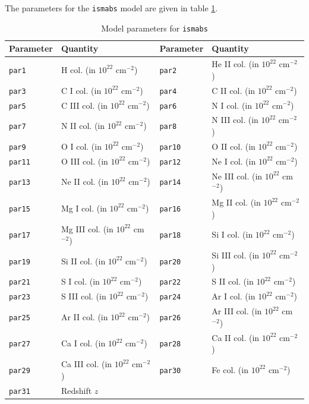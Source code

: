 			The parameters for the \texttt{ismabs} model are given in table \ref{param:ismabs}.
			\begin{table}[h!]
				\centering
				\caption{Model parameters for \texttt{ismabs}}
				\label{param:ismabs}
				\begin{tabular}{p{}p{}|p{}p{}}
					\hline
					\textbf{Parameter} & \textbf{Quantity} & \textbf{Parameter} & \textbf{Quantity} \\ \hline
					{\texttt{par1}} & {H col. (in $10^{22}$ cm$^{-2}$)} & {\texttt{par2}} & {He II col. (in $10^{22}$ cm$^{-2}$)} \\ %
					{\texttt{par3}} & {C I col. (in $10^{22}$ cm$^{-2}$)} & {\texttt{par4}} & {C II col. (in $10^{22}$ cm$^{-2}$)} \\ %
					{\texttt{par5}} & {C III col. (in $10^{22}$ cm$^{-2}$)} & {\texttt{par6}} & {N I col. (in $10^{22}$ cm$^{-2}$)} \\ %
					{\texttt{par7}} & {N II col. (in $10^{22}$ cm$^{-2}$)} & {\texttt{par8}} & {N III col. (in $10^{22}$ cm$^{-2}$)} \\ %
					{\texttt{par9}} & {O I col. (in $10^{22}$ cm$^{-2}$)} & {\texttt{par10}} & {O II col. (in $10^{22}$ cm$^{-2}$)} \\ %
					{\texttt{par11}} & {O III col. (in $10^{22}$ cm$^{-2}$)} & {\texttt{par12}} & {Ne I col. (in $10^{22}$ cm$^{-2}$)} \\ %
					{\texttt{par13}} & {Ne II col. (in $10^{22}$ cm$^{-2}$)} & {\texttt{par14}} & {Ne III col. (in $10^{22}$ cm$^{-2}$)} \\ %
					{\texttt{par15}} & {Mg I col. (in $10^{22}$ cm$^{-2}$)} & {\texttt{par16}} & {Mg II col. (in $10^{22}$ cm$^{-2}$)} \\ %
					{\texttt{par17}} & {Mg III col. (in $10^{22}$ cm$^{-2}$)} & {\texttt{par18}} & {Si I col. (in $10^{22}$ cm$^{-2}$)} \\ %
					{\texttt{par19}} & {Si II col. (in $10^{22}$ cm$^{-2}$)} & {\texttt{par20}} & {Si III col. (in $10^{22}$ cm$^{-2}$)} \\ %
					{\texttt{par21}} & {S I col. (in $10^{22}$ cm$^{-2}$)} & {\texttt{par22}} & {S II col. (in $10^{22}$ cm$^{-2}$)} \\ %
					{\texttt{par23}} & {S III col. (in $10^{22}$ cm$^{-2}$)} & {\texttt{par24}} & {Ar I col. (in $10^{22}$ cm$^{-2}$)} \\ %
					{\texttt{par25}} & {Ar II col. (in $10^{22}$ cm$^{-2}$)} & {\texttt{par26}} & {Ar III col. (in $10^{22}$ cm$^{-2}$)} \\ %
					{\texttt{par27}} & {Ca I col. (in $10^{22}$ cm$^{-2}$)} & {\texttt{par28}} & {Ca II col. (in $10^{22}$ cm$^{-2}$)} \\ %
					{\texttt{par29}} & {Ca III col. (in $10^{22}$ cm$^{-2}$)} & {\texttt{par30}} & {Fe col. (in $10^{22}$ cm$^{-2}$)} \\ %
					{\texttt{par31}} & {Redshift $z$} & {} & {} \\ \hline
				\end{tabular}
			\end{table}
			
